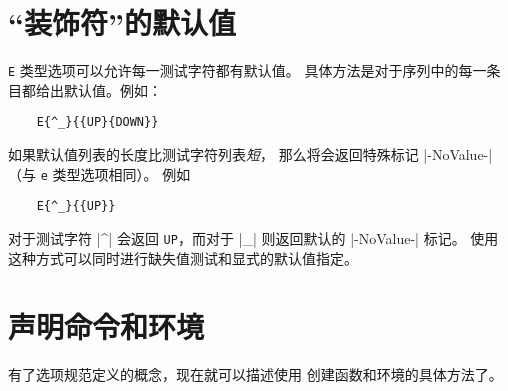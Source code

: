 \documentclass{l3doc}
\begin{document}
%
\section{“装饰符”的默认值}
\label{sec:embellishment}

%
\texttt{E} 类型选项可以允许每一测试字符都有默认值。
具体方法是对于序列中的每一条目都给出默认值。例如：
\begin{verbatim}
    E{^_}{{UP}{DOWN}}
\end{verbatim}
如果默认值列表的长度比测试字符列表\emph{短}，
那么将会返回特殊标记 |-NoValue-|（与 \texttt{e} 类型选项相同）。
例如
\begin{verbatim}
    E{^_}{{UP}}
\end{verbatim}
对于测试字符 |^| 会返回 \texttt{UP}，而对于 |_| 则返回默认的 |-NoValue-| 标记。
使用这种方式可以同时进行缺失值测试和显式的默认值指定。

%
\section{声明命令和环境}

%
有了选项规范定义的概念，现在就可以描述使用  创建函数和环境的具体方法了。
\end{document}
